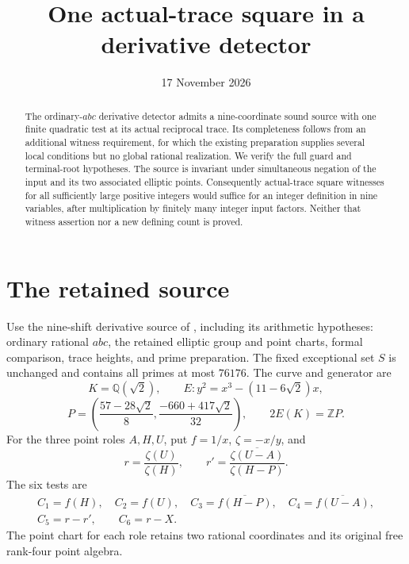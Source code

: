\documentclass[11pt,a4paper]{article}
\title{One actual-trace square in a derivative detector}
\author{}\date{17 November 2026}
\newcommand{\Q}{\mathbb Q}\newcommand{\Z}{\mathbb Z}
\begin{document}
\maketitle

\begin{abstract}
The ordinary-$abc$ derivative detector admits a nine-coordinate
sound source with one finite quadratic test at its actual reciprocal
trace. Its completeness follows from an additional witness
requirement, for which the existing preparation supplies several local
conditions but no global rational realization. We verify the full
guard and terminal-root hypotheses. The source is invariant under
simultaneous negation of the input and its two associated elliptic
points. Consequently actual-trace square witnesses for all sufficiently
large positive integers would suffice for an integer definition in
nine variables, after multiplication by finitely many integer input
factors. Neither that witness assertion nor a new defining count
is proved.
\end{abstract}

\section{The retained source}

Use the nine-shift derivative source of \cite{Derivative}, including
its arithmetic hypotheses: ordinary rational $abc$, the retained
elliptic group and point charts, formal comparison, trace heights,
and prime preparation. The fixed exceptional set $S$ is unchanged
and contains all primes at most $76176$.
The curve and generator are
\[
 K=\Q(\sqrt2),\qquad E:y^2=x^3-(11-6\sqrt2)x,
\]
\[
 P=\left(\frac{57-28\sqrt2}{8},\frac{-660+417\sqrt2}{32}\right),
 \qquad 2E(K)=\Z P.
\]
For the three point roles $A,H,U$, put $f=1/x$, $\zeta=-x/y$, and
\[
 r=\frac{\zeta(U)}{\zeta(H)},\qquad
 r'=\overline{\frac{\zeta(U-A)}{\zeta(H-P)}}.
\]
The six tests are
\[
 \begin{gathered}
 C_1=f(H),\quad C_2=f(U),\quad
 C_3=\overline{f(H-P)},\quad C_4=\overline{f(U-A)},\\
 C_5=r-r',\qquad C_6=r-X.
 \end{gathered}
\]
The point chart for each role retains two rational coordinates and
its original free rank-four point algebra.
\end{document}
